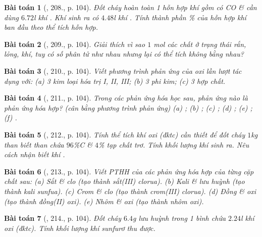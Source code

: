 \documentclass{article}
\newtheorem{baitoan}{Bài toán}
\begin{document}
\begin{baitoan}[\cite{An_400_BT_Hoa_Hoc_8_2020}, 208., p. 104]
	Đốt cháy hoàn toàn 1 hỗn hợp khí gồm có \emph{CO} \& \emph{} cần dùng $6.72$\emph{l} khí \emph{}. Khí sinh ra có $4.48$\emph{l} khí \emph{}. Tính thành phần \% của hỗn hợp khí ban đầu theo thể tích hỗn hợp.
\end{baitoan}

\begin{baitoan}[\cite{An_400_BT_Hoa_Hoc_8_2020}, 209., p. 104]
	Giải thích vì sao $1$ \emph{mol} các chất ở trạng thái rắn, lỏng, khí, tuy có số phân tử như nhau nhưng lại có thể tích không bằng nhau?
\end{baitoan}

\begin{baitoan}[\cite{An_400_BT_Hoa_Hoc_8_2020}, 210., p. 104]
	Viết phương trình phản ứng của oxi lần lượt tác dụng với: (a) 3 kim loại hóa trị I, II, III; (b) 3 phi kim; (c) 3 hợp chất.
\end{baitoan}

\begin{baitoan}[\cite{An_400_BT_Hoa_Hoc_8_2020}, 211., p. 104]
	Trong các phản ứng hóa học sau, phản ứng nào là phản ứng hóa hợp? (cân bằng phương trình phản ứng) (a) \emph{}; (b) \emph{}; (c) \emph{}; (d) \emph{}; (e) \emph{}; (f) \emph{}.
\end{baitoan}

\begin{baitoan}[\cite{An_400_BT_Hoa_Hoc_8_2020}, 212., p. 104]
	Tính thể tích khí oxi (đktc) cần thiết để đốt cháy $1$\emph{kg} than biết than chứa $96$\%\emph{C} \& $4$\% tạp chất trơ. Tính khối lượng khí \emph{} sinh ra. Nêu cách nhận biết khí \emph{}.
\end{baitoan}

\begin{baitoan}[\cite{An_400_BT_Hoa_Hoc_8_2020}, 213., p. 104]
	Viết PTHH của các phản ứng hóa hợp của từng cặp chất sau: (a) Sắt \& clo (tạo thành sắt(III) clorua). (b) Kali \& lưu huỳnh (tạo thành kali sunfua). (c) Crom \& clo (tạo thành crom(III) clorua). (d) Đồng \& oxi (tạo thành đồng(II) oxi). (e) Nhôm \& oxi (tạo thành nhôm oxi).
\end{baitoan}

\begin{baitoan}[\cite{An_400_BT_Hoa_Hoc_8_2020}, 214., p. 104]
	Đốt cháy $6.4$\emph{g} lưu huỳnh trong 1 bình chứa $2.24$\emph{l} khí oxi (đktc). Tính khối lượng khí sunfurơ \emph{} thu được.
\end{baitoan}
\end{document}
